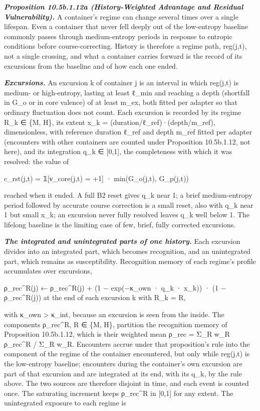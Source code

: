 \documentclass[
]{article}
\begin{document}
\emph{\textbf{Proposition 10.5b.1.12a (History-Weighted Advantage and
Residual Vulnerability).}} A container's regime can change several times
over a single lifespan. Even a container that never fell deeply out of
the low-entropy baseline commonly passes through medium-entropy periods
in response to entropic conditions before course-correcting. History is
therefore a regime path, reg(j,t), not a single crossing, and what a
container carries forward is the record of its excursions from the
baseline and of how each one ended.

\emph{\textbf{Excursions.}} An excursion k of container j is an interval
in which reg(j,t) is medium- or high-entropy, lasting at least ℓ\_min
and reaching a depth (shortfall in G\_o or in core valence) of at least
m\_ex, both fitted per adapter so that ordinary fluctuation does not
count. Each excursion is recorded by its regime R\_k ∈ \{M, H\}, its
extent x\_k = (duration/ℓ\_ref)·(depth/m\_ref), dimensionless, with
reference duration ℓ\_ref and depth m\_ref fitted per adapter
(encounters with other containers are counted under Proposition
10.5b.1.12, not here), and its integration q\_k ∈ {[}0,1{]}, the
completeness with which it was resolved: the value of

c\_rst(j,t) = 𝟙{[}ν\_core(j,t) = +1{]} · min(G\_o(j,t), G\_p(j,t))

reached when it ended. A full B2 reset gives q\_k near 1; a brief
medium-entropy period followed by accurate course correction is a small
reset, also with q\_k near 1 but small x\_k; an excursion never fully
resolved leaves q\_k well below 1. The lifelong baseline is the limiting
case of few, brief, fully corrected excursions.

\emph{\textbf{The integrated and unintegrated parts of one history.}}
Each excursion divides into an integrated part, which becomes
recognition, and an unintegrated part, which remains as susceptibility.
Recognition memory of each regime's profile accumulates over excursions,

ρ\_rec\^{}R(j) ← ρ\_rec\^{}R(j) + (1 − exp(−κ\_own · q\_k · x\_k)) · (1
− ρ\_rec\^{}R(j)) at the end of each excursion k with R\_k = R,

with κ\_own \textgreater{} κ\_int, because an excursion is seen from the
inside. The components ρ\_rec\^{}R, R ∈ \{M, H\}, partition the
recognition memory of Proposition 10.5b.1.12, which is their weighted
mean ρ\_rec = Σ\_R w\_R ρ\_rec\^{}R / Σ\_R w\_R. Encounters accrue under
that proposition's rule into the component of the regime of the
container encountered, but only while reg(j,t) is the low-entropy
baseline; encounters during the container's own excursion are part of
that excursion and are integrated at its end, with its q\_k, by the rule
above. The two sources are therefore disjoint in time, and each event is
counted once. The saturating increment keeps ρ\_rec\^{}R in {[}0,1{]}
for any extent. The unintegrated exposure to each regime is
\end{document}
